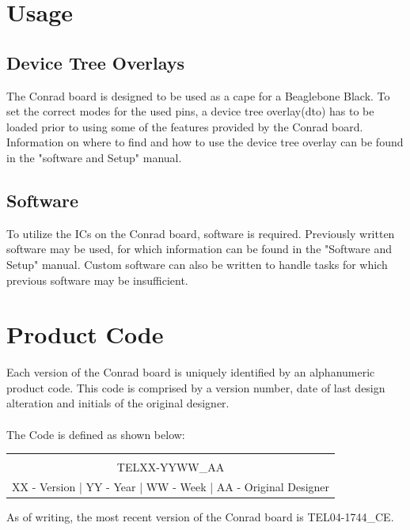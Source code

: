 \documentclass[12pt,article]{memoir}
\begin{document}
\chapter{Usage}
\section{Device Tree Overlays}
The Conrad board is designed to be used as a cape for a Beaglebone Black. To set the correct modes for the used pins, a device tree overlay(dto) has to be loaded prior to using some of the features provided by the Conrad board. Information on where to find and how to use the device tree overlay can be found in the "software and Setup" manual.\\

\section{Software}
To utilize the ICs on the Conrad board, software is required. Previously written software may be used, for which information can be found in the "Software and Setup" manual. Custom software can also be written to handle tasks for which previous software may be insufficient.\\

\chapter{Product Code}
Each version of the Conrad board is uniquely identified by an alphanumeric product code. This code is comprised by a version number, date of last design alteration and initials of the original designer.\\\\
The Code is defined as shown below:

\begin{table}[h]
\centering
{}
\begin{tabular}{|c|}
	\hline
	\huge \\
	\huge TEL\colorbox{shadecolor1}{XX}-\colorbox{shadecolor2}{YY}\colorbox{shadecolor3}{WW}\_\colorbox{shadecolor4}{AA} \\
	
	\colorbox{shadecolor1}{XX} - Version | \colorbox{shadecolor2}{YY} - Year | \colorbox{shadecolor3}{WW} - Week | \colorbox{shadecolor4}{AA} - Original Designer\\
	
	\hline
\end{tabular}
\end{table}
\noindent
As of writing, the most recent version of the Conrad board is TEL04-1744\_CE.\\\\

\end{document}
